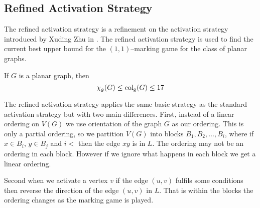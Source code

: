 \subsection{Refined Activation Strategy}\label{sec:refActStrat}
The refined activation strategy is a refinement on the activation strategy introduced by Xuding Zhu in \cite{Zhu2008}. The refined activation strategy is used to find the current best upper bound for the $(1,1)$--marking game for the class of planar graphs. 

\begin{theorem}
    If $G$ is a planar graph, then \[\chi_g(G)\leq\operatorname{col_g}(G)\leq17\]
\end{theorem}

The refined activation strategy applies the same basic strategy as the standard activation strategy but with two main differences. First, instead of a linear ordering on $V(G)$ we use orientation of the graph $G$ as our ordering. This is only a partial ordering, so we partition $V(G)$ into blocks $B_1,B_2,\dots,B_i$, where if $x \in B_i$, $y \in B_j$ and $i <$ then the edge $xy$ is in $L$. The ordering may not be an ordering in each block. However if we ignore what happens in each block we get a linear ordering.

Second when we activate a vertex $v$ if the edge $(u,v)$ fulfils some conditions then reverse the direction of the edge $(u,v)$ in $L$. That is within the blocks the ordering changes as the marking game is played.

%
%
%
%


